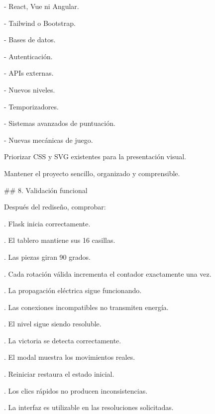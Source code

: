 \par\smallskip
\noindent - React, Vue ni Angular.\par
\noindent - Tailwind o Bootstrap.\par
\noindent - Bases de datos.\par
\noindent - Autenticación.\par
\noindent - APIs externas.\par
\noindent - Nuevos niveles.\par
\noindent - Temporizadores.\par
\noindent - Sistemas avanzados de puntuación.\par
\noindent - Nuevas mecánicas de juego.\par
\par\smallskip
\noindent Priorizar CSS y SVG existentes para la presentación visual.\par
\par\smallskip
\noindent Mantener el proyecto sencillo, organizado y comprensible.\par
\par\smallskip
\noindent \#\# 8. Validación funcional\par
\par\smallskip
\noindent Después del rediseño, comprobar:\par
\par\smallskip
{}. Flask inicia correctamente.\par
{}. El tablero mantiene sus 16 casillas.\par
{}. Las piezas giran 90 grados.\par
{}. Cada rotación válida incrementa el contador exactamente una vez.\par
{}. La propagación eléctrica sigue funcionando.\par
{}. Las conexiones incompatibles no transmiten energía.\par
{}. El nivel sigue siendo resoluble.\par
{}. La victoria se detecta correctamente.\par
{}. El modal muestra los movimientos reales.\par
{}. Reiniciar restaura el estado inicial.\par
{}. Los clics rápidos no producen inconsistencias.\par
{}. La interfaz es utilizable en las resoluciones solicitadas.\par
